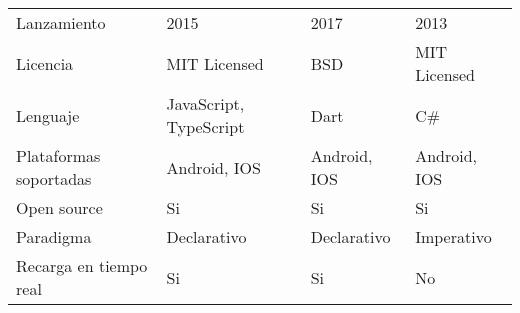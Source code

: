 \begin{longtable}{|p{5cm}|p{3cm}|p{3cm}|p{3cm}|}
    \hline \hline
    \endlastfoot
    Lanzamiento                                    & 2015                                                      & 2017                                                                                                           & 2013                                                                                                                         \\
    Licencia                                       & MIT Licensed                                              & BSD                                                                                                            & MIT Licensed                                                                                                                 \\
    Lenguaje                                       & JavaScript, TypeScript                                    & Dart                                                                                                           & C\#                                                                                                                          \\
    Plataformas soportadas                         & Android, IOS                                              & Android, IOS                                                                                                   & Android, IOS                                                                                                                 \\
    Open source                                    & Si                                                        & Si                                                                                                             & Si                                                                                                                           \\
    Paradigma                                      & Declarativo                                               & Declarativo                                                                                                    & Imperativo                                                                                                                   \\
    Recarga en tiempo real                         & Si                                                        & Si                                                                                                             & No                                                                                                                           \\

\end{longtable}

